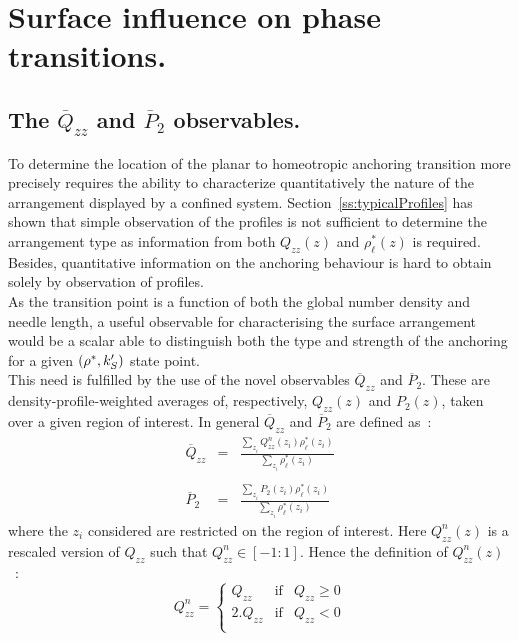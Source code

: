 

\section{Surface influence on phase transitions.}
\label{s:surfInfphaseTrans}



\subsection{ The $\overline{Q}_{zz}$ and $\overline{P}_2$ observables.}


To determine the location of the planar to homeotropic anchoring transition more precisely 
requires the ability to
characterize quantitatively the nature of the arrangement displayed by a confined system. 
Section~\ref{ss:typicalProfiles} has shown that simple observation of the profiles is not
sufficient to determine the arrangement type as information from both $Q_{zz}(z)$ and 
$\rho^{*}_\ell(z)$ is required. Besides, quantitative information on the anchoring behaviour is
hard to obtain solely by observation of profiles.\\
As the transition point is a function of both the global number density and needle
length, a useful observable for characterising the surface arrangement would be a scalar
able to distinguish 
both the type and strength of the anchoring for a given $(\rho^{*}, k_S^{\prime})$ state point.\\
This need is fulfilled by the use of the novel observables $\overline{Q}_{zz}$ and 
$\overline{P}_2$. These are density-profile-weighted averages of,
respectively, $Q_{zz}(z)$ and $P_2(z)$, taken over a given
region of interest. In general $\overline{Q}_{zz}$  and $\overline{P}_2$ are defined as~:
%
\begin{eqnarray}
	\overline{Q}_{zz} &=& \frac{\sum_{z_i} Q^{n}_{zz}(z_i) \rho^{*}_\ell(z_i)}
			{\sum_{z_i} \rho^{*}_\ell(z_i)}		\\
	\nonumber \\ 
	\overline{P}_2 &=& \frac{\sum_{z_i} P_2(z_i) \rho^{*}_\ell(z_i)}
			{\sum_{z_i} \rho^{*}_\ell(z_i)}	
\end{eqnarray}
%
where the $z_i$ considered are restricted on the region of interest.
Here $Q^{n}_{zz}(z)$ is a rescaled version of $Q_{zz}$ such that $Q^{n}_{zz}\in[-1:1]$. Hence the
definition of $Q^{n}_{zz}(z)$~:
%
\begin{equation}
	Q^{n}_{zz} = \left\{	%
	\begin{array}{ccc}
		Q_{zz}		&\text{if}	&Q_{zz} \geq 0	\\
		2.Q_{zz}	&\text{if}	&Q_{zz} < 0\\
	\end{array}
	\right.
\end{equation}


